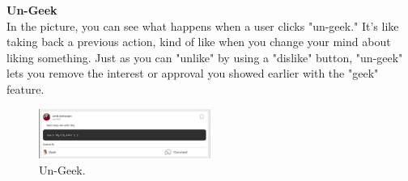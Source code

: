 \textbf{Un-Geek}
\\In the picture, you can see what happens when a user clicks "un-geek." It's like taking back a previous action, kind of like when you change your mind about liking something. Just as you can "unlike" by using a "dislike" button, "un-geek" lets you remove the interest or approval you showed earlier with the "geek" feature.
\begin{figure}[H]
    \centering
    \includegraphics[width=0.5\textwidth]{Outcome-ss/ungeek.png}
    \caption{Un-Geek.}
    \label{fig:Un-Geek}
\end{figure}

